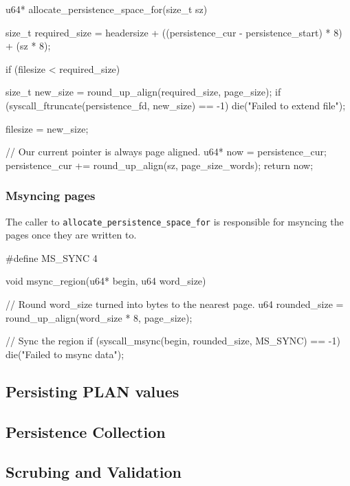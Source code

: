 \begin{clang}
u64* allocate_persistence_space_for(size_t sz) {
  size_t required_size = headersize
                       + ((persistence_cur - persistence_start) * 8)
                       + (sz * 8);

  if (filesize < required_size) {
    size_t new_size = round_up_align(required_size, page_size);
    if (syscall_ftruncate(persistence_fd, new_size) == -1) {
      die("Failed to extend file");
    }

    filesize = new_size;
  }

  // Our current pointer is always page aligned.
  u64* now = persistence_cur;
  persistence_cur += round_up_align(sz, page_size_words);
  return now;
}
\end{clang}

\subsubsection{Msyncing pages}

The caller to \lstinline|allocate_persistence_space_for| is responsible for
msyncing the pages once they are written to.

\begin{clang}

#define MS_SYNC 4

void msync_region(u64* begin, u64 word_size) {
  // Round word_size turned into bytes to the nearest page.
  u64 rounded_size = round_up_align(word_size * 8, page_size);

  // Sync the region
  if (syscall_msync(begin, rounded_size, MS_SYNC) == -1) {
    die("Failed to msync data");
  }
}
\end{clang}

\subsection{Persisting PLAN values}




\subsection{Persistence Collection}



\subsection{Scrubing and Validation}

